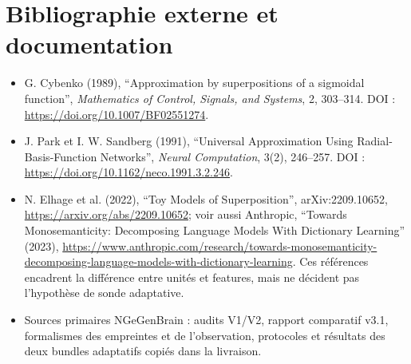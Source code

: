 \documentclass[11pt,a4paper,oneside]{report}
\begin{document}
\chapter{Bibliographie externe et documentation}
\begin{itemize}
\item G. Cybenko (1989), ``Approximation by superpositions of a sigmoidal function'', \emph{Mathematics of Control, Signals, and Systems}, 2, 303--314. DOI : \url{https://doi.org/10.1007/BF02551274}.
\item J. Park et I. W. Sandberg (1991), ``Universal Approximation Using Radial-Basis-Function Networks'', \emph{Neural Computation}, 3(2), 246--257. DOI : \url{https://doi.org/10.1162/neco.1991.3.2.246}.
\item N. Elhage et al. (2022), ``Toy Models of Superposition'', arXiv:2209.10652, \url{https://arxiv.org/abs/2209.10652}; voir aussi Anthropic, ``Towards Monosemanticity: Decomposing Language Models With Dictionary Learning'' (2023), \url{https://www.anthropic.com/research/towards-monosemanticity-decomposing-language-models-with-dictionary-learning}. Ces références encadrent la différence entre unités et features, mais ne décident pas l'hypothèse de sonde adaptative.
\item Sources primaires NGeGenBrain : audits V1/V2, rapport comparatif v3.1, formalismes des empreintes et de l'observation, protocoles et résultats des deux bundles adaptatifs copiés dans la livraison.
\end{itemize}
\end{document}
